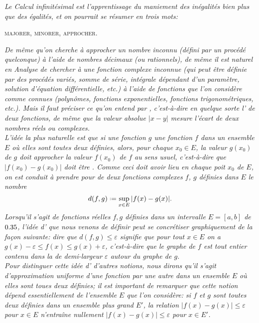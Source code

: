 
\textsl{Le Calcul infinitésimal est l'apprentissage du maniement des \emph{inégalités} bien plus que des égalités, et on pourrait se résumer en trois mots:}
\begin{center}
        \textsc{majorer, minorer, approcher.}
\end{center}
\textsl{De même qu'on cherche à \emph{approcher} un \emph{nombre} inconnu (défini par un procédé quelconque) à l'aide de nombres décimaux (ou rationnels), de même il est naturel en Analyse de chercher à  une \emph{fonction} complexe inconnue (qui peut être définie par des procédés variés, somme de série, intégrale dépendant d'un paramètre, solution d'équation différentielle, etc.) à l'aide de fonctions que l'on considère comme \emph{connues} (polynômes, fonctions exponentielles, fonctions trigonométriques, etc.). Mais il faut préciser ce qu'on entend par , c'est-à-dire  en quelque sorte l' de deux fonctions, de même que la valeur absolue $|x-y|$ mesure l'écart de deux nombres réels ou complexes. \\
L'idée la plus naturelle est que si une fonction $g$  une fonction $f$ dans un ensemble $E$ où elles sont toutes deux définies, alors, pour chaque $x_0 \in E$, la \emph{valeur} $g(x_0)$ de $g$ doit \emph{approcher} la \emph{valeur} $f(x_0)$ de $f$ au sens usuel, c'est-à-dire que $|f(x_0)-g(x_0)|$ doit être . Comme ceci doit avoir lieu en \emph{chaque} poit $x_0$ de $E$, on est conduit à prendre pour  de deux fonctions complexes $f$, $g$ définies dans $E$ le nombre
$$d(f, g) \defeq \sup_{x \in E} |f(x)-g(x)|.$$
Lorsqu'il s'agit de fonctions \emph{réelles} $f, g$ définies dans un intervalle $E = [a, b]$ de $0.35$, l'idée d' que nous venons de définir peut se concrétiser graphiquement de la façon suivante: dire que $d(f,g) \leqslant \varepsilon$ signifie que pour tout $x \in E$ on a $g(x)-\varepsilon \leqslant f(x) \leqslant g(x) + \varepsilon$, c'est-à-dire que le graphe de $f$ est \emph{tout entier} contenu dans la  de demi-largeur $\varepsilon$ autour du graphe de $g$. \\
Pour distinguer cette idée d' d'autres notions, nous dirons qu'il s'agit d'\emph{approximation uniforme} d'une fonction par une autre dans un ensemble $E$ où elles sont toues deux définies; il est important de remarquer que cette notion \emph{dépend essentiellement} de l'ensemble $E$ que l'on considère: si $f$ et $g$ sont toutes deux définies dans un ensemble plus grand $E'$, la relation $|f(x) - g(x)| \leqslant \varepsilon$ pour $x \in E$ n'entraîne nullement $|f(x)-g(x)| \leqslant \varepsilon$ pour $x \in E'$. \\
}
